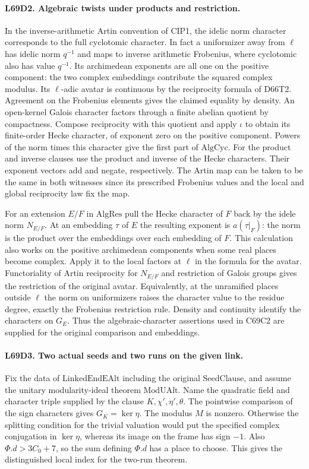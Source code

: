 \paragraph{L69D2. Algebraic twists under products and restriction.}
In the inverse-arithmetic Artin convention of CIP1, the idelic norm
character corresponds to the full cyclotomic character. In fact a
uniformizer away from $\ell$ has idelic norm $q^{-1}$ and maps
to inverse arithmetic Frobenius, where cyclotomic also has value
$q^{-1}$. Its archimedean exponents are all one on the positive
component: the two complex embeddings contribute the squared
complex modulus. Its $\ell$-adic avatar is continuous by the
reciprocity formula of D66T2. Agreement on the Frobenius elements
gives the claimed equality by density. An open-kernel Galois
character factors through a finite abelian quotient by compactness.
Compose reciprocity with this quotient and apply $\iota$ to obtain
its finite-order Hecke character, of exponent zero on the positive
component. Powers of the norm times this character give the first
part of $\mathrm{AlgCyc}$. For the product and inverse clauses
use the product and inverse of the Hecke characters. Their exponent
vectors add and negate, respectively. The Artin map can be taken
to be the same in both witnesses since its prescribed Frobenius
values and the local and global reciprocity law fix the map.

For an extension $E/F$ in $\mathrm{AlgRes}$ pull the Hecke character
of $F$ back by the idele norm $N_{E/F}$. At an embedding $\tau$ of
$E$ the resulting exponent is $a(\tau|_F)$: the norm is the product
over the embeddings over each embedding of $F$. This calculation
also works on the positive archimedean components when some real
places become complex. Apply it to the local factors at $\ell$ in
the formula for the avatar. Functoriality of Artin reciprocity
for $N_{E/F}$ and restriction of Galois groups gives the restriction
of the original avatar. Equivalently, at the unramified places
outside $\ell$ the norm on uniformizers raises the character value
to the residue degree, exactly the Frobenius restriction rule.
Density and continuity identify the characters on $G_E$.
Thus the algebraic-character assertions used in C69C2 are supplied
for the original comparison and embeddings.

\paragraph{L69D3. Two actual seeds and two runs on the given link.}
Fix the data of $\mathrm{LinkedEndEAlt}$ including the original
$\mathrm{SeedClause}$, and assume the unitary modularity-ideal
theorem $\mathrm{ModUAlt}$. Name the quadratic field and character
triple supplied by the clause $K,\chi',\eta',\theta$.
The pointwise comparison of the sign characters gives
$G_K=\ker\eta$. The modulus $M$ is nonzero. Otherwise the
splitting condition for the trivial valuation would put the
specified complex conjugation in $\ker\eta$, whereas its image on
the frame has sign $-1$. Also $\Phi.d>3C_0+7$, so the sum defining
$\Phi.d$ has a place to choose. This gives the distinguished local
index for the two-run theorem.


